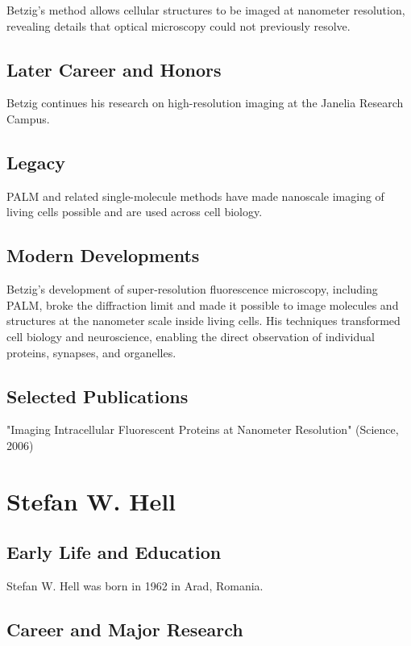 Betzig's method allows cellular structures to be imaged at nanometer resolution, revealing details that optical microscopy could not previously resolve.

\subsection*{Later Career and Honors}

Betzig continues his research on high-resolution imaging at the Janelia Research Campus.

\subsection*{Legacy}

PALM and related single-molecule methods have made nanoscale imaging of living cells possible and are used across cell biology.

\subsection*{Modern Developments}

Betzig's development of super-resolution fluorescence microscopy, including PALM, broke the diffraction limit and made it possible to image molecules and structures at the nanometer scale inside living cells. His techniques transformed cell biology and neuroscience, enabling the direct observation of individual proteins, synapses, and organelles.

\subsection*{Selected Publications}

"Imaging Intracellular Fluorescent Proteins at Nanometer Resolution" (Science, 2006)

\clearpage

\section{Stefan W. Hell}

\subsection*{Early Life and Education}

Stefan W. Hell was born in 1962 in Arad, Romania.

\subsection*{Career and Major Research}

